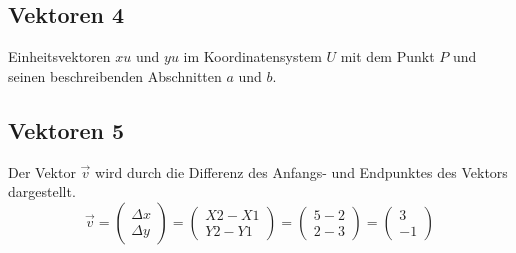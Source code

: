 \documentclass{article}
\newcommand{\m}[1]{\begin{pmatrix}#1\end{pmatrix}}
\begin{document}
    \subsection{Vektoren 4}
    \begin{figure}[h]
        \centering
    \end{figure}
    Einheitsvektoren $xu$ und $yu$ im Koordinatensystem $U$ mit dem Punkt $P$ und seinen beschreibenden Abschnitten $a$ und $b$.
    
    \newpage


    \subsection{Vektoren 5}
    \begin{figure}[h]
        \centering
    \end{figure}
    Der Vektor $\vec{v}$ wird durch die Differenz des Anfangs- und Endpunktes des Vektors dargestellt.
    \[
        \vec{v} = \m{\Delta{x} \\ \Delta{y}} = \m{X2 - X1 \\ Y2 - Y1} = \m{5 - 2 \\ 2 - 3} = \m{3 \\ -1}
    \]
\end{document}
